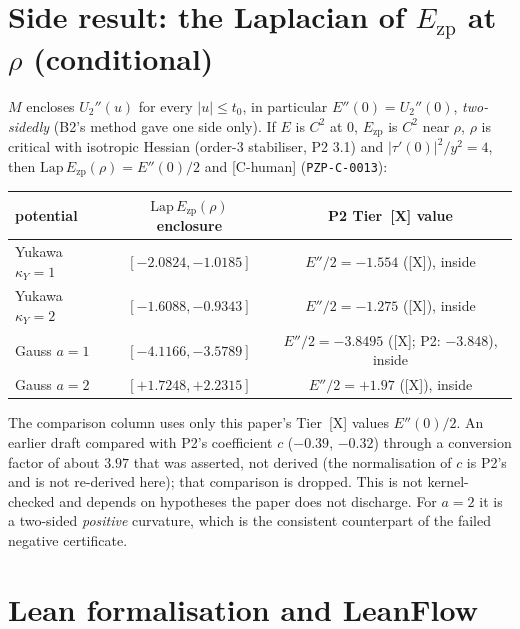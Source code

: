 \documentclass[10pt]{article}
\newcommand{\tier}[1]{\textsf{[#1]}}
\newcommand{\tX}{\tier{X}}
\newcommand{\tCh}{\tier{C-human}}
\newcommand{\Ezp}{E_{\mathrm{zp}}}
\begin{document}
\section{Side result: the Laplacian of \texorpdfstring{$\Ezp$ at $\rho$}{Ezp at rho} (conditional)}\label{sec:lap}
$M$ encloses $U_2''(u)$ for every $|u|\le t_0$, in particular $E''(0)=U_2''(0)$, \emph{two-sidedly} (B2's method gave one side only). If $E$ is $C^2$ at $0$, $\Ezp$ is $C^2$ near $\rho$, $\rho$ is critical with isotropic Hessian (order-3 stabiliser, P2 3.1) and $|\tau'(0)|^2/y^2=4$, then $\mathrm{Lap}\,\Ezp(\rho)=E''(0)/2$ and \tCh{} (\texttt{PZP-C-0013}):
\begin{center}\small\begin{tabular}{lcc}\toprule
potential & $\mathrm{Lap}\,\Ezp(\rho)$ enclosure & P2 Tier~\tX{} value\\\midrule
Yukawa $\kappa_Y=1$ & $[-2.0824,-1.0185]$ & $E''/2=-1.554$ (\tX), inside\\
Yukawa $\kappa_Y=2$ & $[-1.6088,-0.9343]$ & $E''/2=-1.275$ (\tX), inside\\
Gauss $a=1$ & $[-4.1166,-3.5789]$ & $E''/2=-3.8495$ (\tX; P2: $-3.848$), inside\\
Gauss $a=2$ & $[+1.7248,+2.2315]$ & $E''/2=+1.97$ (\tX), inside\\\bottomrule\end{tabular}\end{center}
The comparison column uses only this paper's Tier~\tX{} values $E''(0)/2$. An earlier draft compared with P2's coefficient $c$ ($-0.39$, $-0.32$) through a conversion factor of about $3.97$ that was asserted, not derived (the normalisation of $c$ is P2's and is not re-derived here); that comparison is dropped. This is not kernel-checked and depends on hypotheses the paper does not discharge. For $a=2$ it is a two-sided \emph{positive} curvature, which is the consistent counterpart of the failed negative certificate.

\section{Lean formalisation and LeanFlow}\label{sec:lean}
\end{document}

